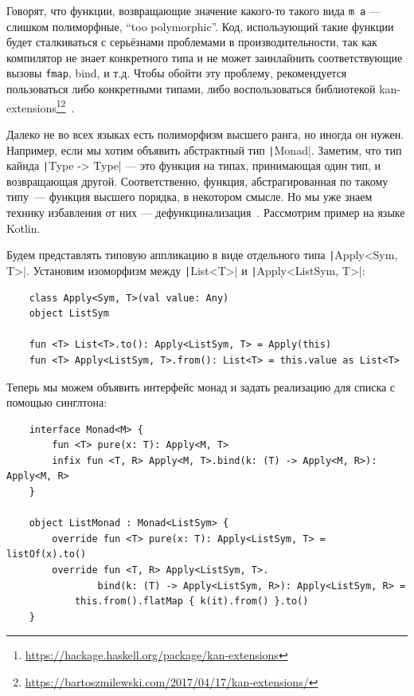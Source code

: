 
Говорят, что функции, возвращающие значение какого-то такого вида \texttt{m a} --- слишком полиморфные, ``too polymorphic''.
Код, использующий такие функции будет сталкиваться с серьёзнами проблемами в производительности, так как компилятор не знает конкретного типа и не может заинлайнить соответствующие вызовы \texttt{fmap}, bind, и т.д.
Чтобы обойти эту проблему, рекомендуется пользоваться либо конкретными типами, либо воспользоваться библиотекой kan-extensions\footnote{\url{https://hackage.haskell.org/package/kan-extensions}}\footnote{\url{https://bartoszmilewski.com/2017/04/17/kan-extensions/}}~\cite[параграф 13.5]{maguire-types}.

Далеко не во всех языках есть полиморфизм высшего ранга, но иногда он нужен.
Например, если мы хотим объявить абстрактный тип \texttt|Monad|.
Заметим, что тип кайнда \texttt|Type -> Type| --- это функция на типах, принимающая один тип, и возвращающая другой.
Соответственно, функция, абстрагированная по такому типу~--- функция высшего порядка, в некотором смысле.
Но мы уже знаем технику избавления от них --- дефункцинализация~\cite{defunctionalization-slides}.
Рассмотрим пример на языке Kotlin.

Будем представлять типовую аппликацию в виде отдельного типа \texttt|Apply<Sym, T>|.
Установим изоморфизм между \texttt|List<T>| и \texttt|Apply<ListSym, T>|:
\begin{verbatim}
    class Apply<Sym, T>(val value: Any)
    object ListSym

    fun <T> List<T>.to(): Apply<ListSym, T> = Apply(this)
    fun <T> Apply<ListSym, T>.from(): List<T> = this.value as List<T>
\end{verbatim}

Теперь мы можем объявить интерфейс монад и задать реализацию для списка с помощью синглтона:
\begin{verbatim}
    interface Monad<M> {
        fun <T> pure(x: T): Apply<M, T>
        infix fun <T, R> Apply<M, T>.bind(k: (T) -> Apply<M, R>): Apply<M, R>
    }

    object ListMonad : Monad<ListSym> {
        override fun <T> pure(x: T): Apply<ListSym, T> = listOf(x).to()
        override fun <T, R> Apply<ListSym, T>.
                bind(k: (T) -> Apply<ListSym, R>): Apply<ListSym, R> =
            this.from().flatMap { k(it).from() }.to()
    }
\end{verbatim}

